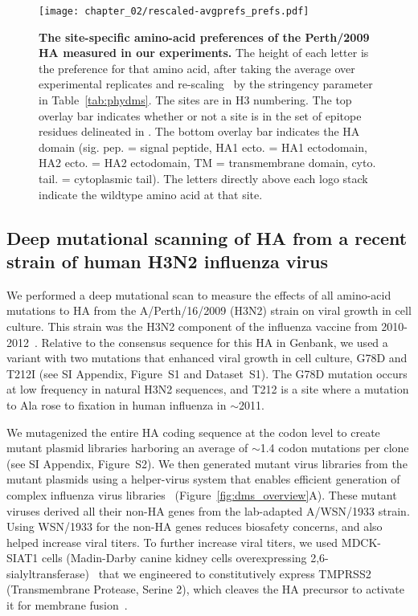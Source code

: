 \begin{figure}
\centering
\texttt{[image: chapter\_02/rescaled-avgprefs\_prefs.pdf]}
\caption[{The site-specific amino-acid preferences of the Perth/2009 HA measured in our experiments.}]{\label{fig:logoplot}
{\bf The site-specific amino-acid preferences of the Perth/2009 HA measured in our experiments.}
The height of each letter is the preference for that amino acid, after taking the average over experimental replicates and re-scaling~\citep{hilton2017phydms} by the stringency parameter in Table~\ref{tab:phydms}.
The sites are in H3 numbering.
The top overlay bar indicates whether or not a site is in the set of epitope residues delineated in \citet{Wolf:2006da}.
The bottom overlay bar indicates the HA domain (sig. pep. = signal peptide, HA1 ecto. = HA1 ectodomain, HA2 ecto. = HA2 ectodomain, TM = transmembrane domain, cyto. tail. = cytoplasmic tail).
The letters directly above each logo stack indicate the wildtype amino acid at that site.
}
\end{figure}

\subsection{Deep mutational scanning of HA from a recent strain of human H3N2 influenza virus}
We performed a deep mutational scan to measure the effects of all amino-acid mutations to HA from the A/Perth/16/2009 (H3N2) strain on viral growth in cell culture.
This strain was the H3N2 component of the influenza vaccine from 2010-2012~\citep{who2010d,who2011}.
Relative to the consensus sequence for this HA in Genbank, we used a variant with two mutations that enhanced viral growth in cell culture, G78D and T212I (see \citet{Lee2018} SI Appendix, Figure~S1 and Dataset~S1).
The G78D mutation occurs at low frequency in natural H3N2 sequences, and T212 is a site where a mutation to Ala rose to fixation in human influenza in $\sim$2011.

We mutagenized the entire HA coding sequence at the codon level to create mutant plasmid libraries harboring an average of $\sim$1.4 codon mutations per clone (see \citet{Lee2018} SI Appendix, Figure~S2).
We then generated mutant virus libraries from the mutant plasmids using a helper-virus system that enables efficient generation of complex influenza virus libraries~\citep{Doud:2016gm} (Figure~\ref{fig:dms_overview}A).
These mutant viruses derived all their non-HA genes from the lab-adapted A/WSN/1933 strain.
Using WSN/1933 for the non-HA genes reduces biosafety concerns, and also helped increase viral titers.
To further increase viral titers, we used MDCK-SIAT1 cells (Madin-Darby canine kidney cells overexpressing 2,6-sialyltransferase)~\citep{matrosovich2003overexpression} that we engineered to constitutively express TMPRSS2 (Transmembrane Protease, Serine 2), which cleaves the HA precursor to activate it for membrane fusion~\citep{bottcher2006proteolytic, bottcher2010cleavage}.

